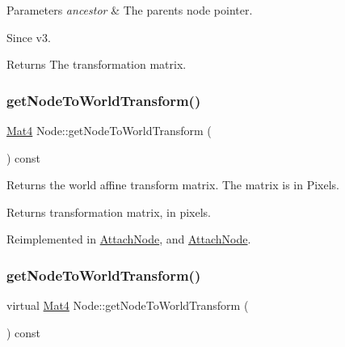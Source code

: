 \begin{DoxyParams}{Parameters}
{\em ancestor} & The parent\textquotesingle{}s node pointer. \\
\hline
\end{DoxyParams}
\begin{DoxySince}{Since}
v3. 
\end{DoxySince}
\begin{DoxyReturn}{Returns}
The transformation matrix. 
\end{DoxyReturn}
\mbox{\label{classNode_a1e46065101d0d5dba32262067d85bf23}} 
\subsubsection{\texorpdfstring{get\+Node\+To\+World\+Transform()}{getNodeToWorldTransform()}\hspace{0.1cm}{\footnotesize\ttfamily [1/2]}}
{\footnotesize\ttfamily \hyperlink{classMat4}{Mat4} Node\+::get\+Node\+To\+World\+Transform (\begin{DoxyParamCaption}{ }\end{DoxyParamCaption}) const\hspace{0.3cm}{\ttfamily [virtual]}}

Returns the world affine transform matrix. The matrix is in Pixels.

\begin{DoxyReturn}{Returns}
transformation matrix, in pixels. 
\end{DoxyReturn}


Reimplemented in \hyperlink{classAttachNode_a53970668bcd205b385e4dd0ae2af8039}{Attach\+Node}, and \hyperlink{classAttachNode_acb93bdd6d5c0e981b081513d3e307b49}{Attach\+Node}.

\mbox{\label{classNode_ae2cede05ce1912aea7903ce17dbebd86}} 
\subsubsection{\texorpdfstring{get\+Node\+To\+World\+Transform()}{getNodeToWorldTransform()}\hspace{0.1cm}{\footnotesize\ttfamily [2/2]}}
{\footnotesize\ttfamily virtual \hyperlink{classMat4}{Mat4} Node\+::get\+Node\+To\+World\+Transform (\begin{DoxyParamCaption}{ }\end{DoxyParamCaption}) const\hspace{0.3cm}{\ttfamily [virtual]}}

